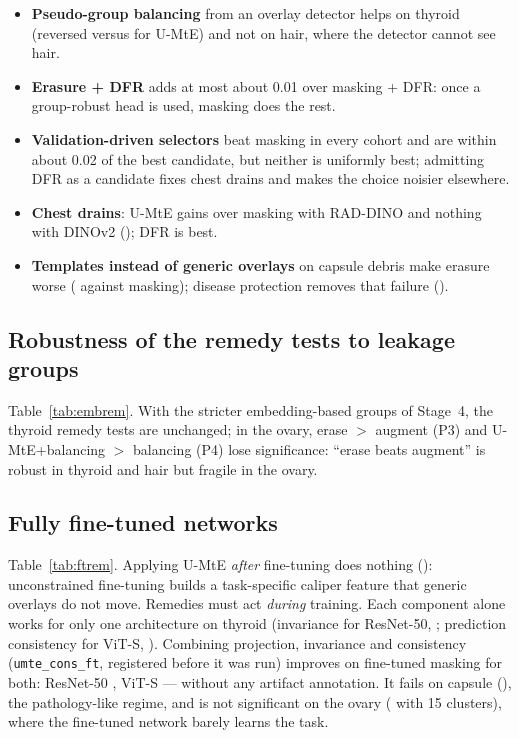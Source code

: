 \begin{itemize}[leftmargin=*]
removing \emph{every} real hair patch (an oracle) gains only \sSixArSLAShairmtsoracletokmask{} over token-level masking.
\item \textbf{Pseudo-group balancing} from an overlay detector helps on thyroid (reversed \sSixArpseudogroupthyroidumtepbalreversedAUROC{}
versus \sSixArpseudogroupthyroidmtereversedAUROC{} for U-MtE) and not on hair, where the detector cannot see hair.
\item \textbf{Erasure + DFR} adds at most about 0.01 over masking + DFR: once a group-robust head is used, masking does the rest.
\item \textbf{Validation-driven selectors} beat masking in every cohort and are within about 0.02 of the best candidate, but
neither is uniformly best; admitting DFR as a candidate fixes chest drains and makes the choice noisier elsewhere.
\item \textbf{Chest drains}: U-MtE gains \sSixRgchestRADDINOdrainsmtemask{} over masking with RAD-DINO and nothing with
DINOv2 (\sSixRgchestDINOvTwodrainsmtemask); DFR is best.
\item \textbf{Templates instead of generic overlays} on capsule debris make erasure worse
(\sSixRgUMtEtemplatescapsulemtemask{} against masking); disease protection removes that failure
(\sSixRgUMtEtemplatescapsulemteprotectmask).
\end{itemize}




\subsection{Robustness of the remedy tests to leakage groups}
Table~\ref{tab:embrem}. With the stricter embedding-based groups of Stage~4, the thyroid remedy tests are unchanged; in the
ovary, erase $>$ augment (P3) and U-MtE+balancing $>$ balancing (P4) lose significance: ``erase beats augment'' is robust in
thyroid and hair but fragile in the ovary.


\subsection{Fully fine-tuned networks}
Table~\ref{tab:ftrem}. Applying U-MtE \emph{after} fine-tuning does nothing (\sSixFtThyroidResNetFiveZeroMtePost): unconstrained
fine-tuning builds a task-specific caliper feature that generic overlays do not move. Remedies must act \emph{during} training.
Each component alone works for only one architecture on thyroid (invariance for ResNet-50, \sSixFtThyroidResNetFiveZeroMteFt;
prediction consistency for ViT-S, \sSixFtThyroidViTSOneSixConsFt). Combining projection, invariance and consistency
(\texttt{umte\_cons\_ft}, registered before it was run) improves on fine-tuned masking for both: ResNet-50
\sSixFtThyroidResNetFiveZeroUmteConsFt, ViT-S \sSixFtThyroidViTSOneSixUmteConsFt{} --- without any artifact annotation. It fails
on capsule (\sSixFtCapsuleResNetFiveZeroUmteConsFt), the pathology-like regime, and is not significant on the ovary
(\sSixFtOvaryResNetFiveZeroUmteConsFt{} with 15 clusters), where the fine-tuned network barely learns the task.


